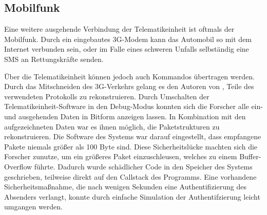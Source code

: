 \documentclass[
    fontsize=12pt,
    headings=small,
    parskip=half,           %
    bibliography=totoc,
    numbers=noenddot,       %
    open=any,               %
    ]{scrreprt}
\begin{document}
\subsection{Mobilfunk}
Eine weitere ausgehende Verbindung der Telematikeinheit ist oftmals der Mobilfunk. Durch ein eingebautes 3G-Modem kann das Automobil so mit dem Internet verbunden sein, oder im Falle eines schweren Unfalls selbständig eine SMS an Rettungskräfte senden.\par
Über die Telematikeinheit können jedoch auch Kommandos übertragen werden. Durch das Mitschneiden des 3G-Verkehrs gelang es den Autoren von \cite{CMK11}, Teile des verwendeten Protokolls zu rekonstruieren. %
Durch Umschalten der Telematikeinheit-Software in den Debug-Modus konnten sich die Forscher alle ein- und ausgehenden Daten in Bitform anzeigen lassen. In Kombination mit den aufgezeichneten Daten war es ihnen möglich, die Paketstrukturen zu rekonstruieren. Die Software des Systems war darauf eingestellt, dass empfangene Pakete niemals größer als 100 Byte sind. Diese Sicherheitslücke machten sich die Forscher zunutze, um ein größeres Paket einzuschleusen, welches zu einem Buffer-Overflow führte. Dadurch wurde schädlicher Code in den Speicher des Systems geschrieben, teilweise direkt auf den Callstack des Programms. Eine vorhandene Sicherheitsmaßnahme, die nach wenigen Sekunden eine Authentifizierung des Absenders verlangt, konnte durch einfache Simulation der Authentifzierung leicht umgangen werden.

\end{document}
